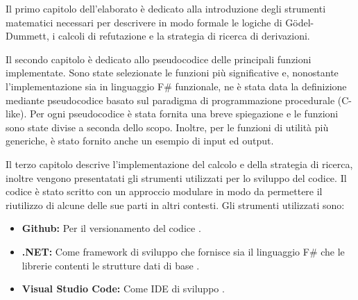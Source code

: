 \documentclass{oist}
\begin{document}
Il primo capitolo dell'elaborato \`e dedicato alla introduzione degli strumenti matematici
necessari per descrivere in modo formale le logiche di G\"odel-Dummett, i calcoli di refutazione
e la strategia di ricerca di derivazioni.

Il secondo capitolo è dedicato allo pseudocodice delle principali funzioni implementate. Sono state selezionate le funzioni più significative e, nonostante l'implementazione sia in linguaggio F\# funzionale, ne è stata data la definizione mediante pseudocodice basato sul paradigma di programmazione procedurale (C-like).
Per ogni pseudocodice è stata fornita una breve spiegazione e le funzioni sono state divise a seconda dello scopo. Inoltre, per le funzioni di utilità più generiche, è stato fornito anche un esempio di input ed output.

Il terzo capitolo descrive l'implementazione del calcolo e della strategia di ricerca, inoltre
vengono presentatati  gli strumenti utilizzati per lo sviluppo del codice.
Il codice \`e stato scritto con un approccio modulare in modo da permettere il riutilizzo di alcune delle sue parti in altri contesti.
Gli strumenti utilizzati sono:
\begin{itemize}
    \item \textbf{Github:} Per il versionamento del codice \cite{github}.
    \item \textbf{.NET:} Come framework di sviluppo che fornisce sia il linguaggio F\# \cite{fsharp} che le librerie contenti le strutture dati di base \cite{dotnet}.
    \item \textbf{Visual Studio Code:} Come IDE di sviluppo \cite{vscode}.
\end{itemize}
\end{document}

